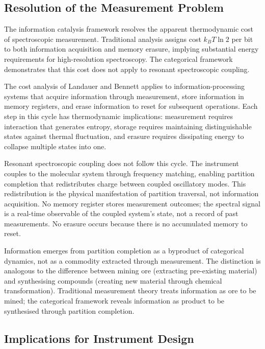 \documentclass[twocolumn,10pt,a4paper]{article}
\theoremstyle{definition}
\theoremstyle{remark}
\begin{document}
\subsection{Resolution of the Measurement Problem}

The information catalysis framework resolves the apparent thermodynamic cost of spectroscopic measurement. Traditional analysis assigns cost $k_B T \ln 2$ per bit to both information acquisition and memory erasure, implying substantial energy requirements for high-resolution spectroscopy. The categorical framework demonstrates that this cost does not apply to resonant spectroscopic coupling.

The cost analysis of Landauer and Bennett applies to information-processing systems that acquire information through measurement, store information in memory registers, and erase information to reset for subsequent operations. Each step in this cycle has thermodynamic implications: measurement requires interaction that generates entropy, storage requires maintaining distinguishable states against thermal fluctuation, and erasure requires dissipating energy to collapse multiple states into one.

Resonant spectroscopic coupling does not follow this cycle. The instrument couples to the molecular system through frequency matching, enabling partition completion that redistributes charge between coupled oscillatory modes. This redistribution is the physical manifestation of partition traversal, not information acquisition. No memory register stores measurement outcomes; the spectral signal is a real-time observable of the coupled system's state, not a record of past measurements. No erasure occurs because there is no accumulated memory to reset.

Information emerges from partition completion as a byproduct of categorical dynamics, not as a commodity extracted through measurement. The distinction is analogous to the difference between mining ore (extracting pre-existing material) and synthesising compounds (creating new material through chemical transformation). Traditional measurement theory treats information as ore to be mined; the categorical framework reveals information as product to be synthesised through partition completion.

\subsection{Implications for Instrument Design}
\end{document}
